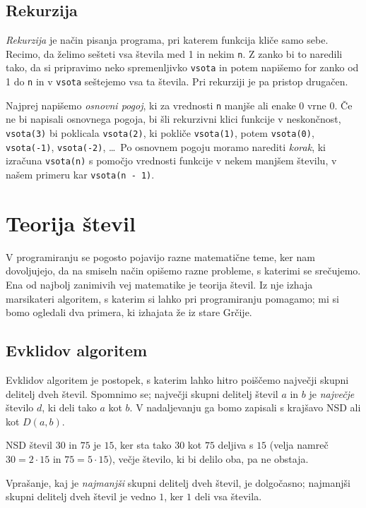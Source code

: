 \documentclass{book}
\begin{document}
\section{Rekurzija}

\emph{Rekurzija} je način pisanja programa, pri katerem funkcija kliče samo
sebe.
Recimo, da želimo sešteti vsa števila med 1 in nekim \verb+n+. Z zanko bi to
naredili tako, da si pripravimo neko spremenljivko \verb+vsota+ in potem
napišemo for zanko od 1 do \verb+n+ in v \verb+vsota+ seštejemo vsa ta števila. Pri
rekurziji je pa pristop drugačen.

\begin{examples}
\end{examples}

Najprej napišemo \emph{osnovni pogoj}, ki za vrednosti \verb+n+ manjše ali enake
0 vrne 0.
Če ne bi napisali osnovnega pogoja, bi šli rekurzivni klici funkcije v
neskončnost,
\verb+vsota(3)+ bi poklicala \verb+vsota(2)+, ki pokliče \verb+vsota(1)+, potem
\verb+vsota(0)+, \verb+vsota(-1)+, \verb+vsota(-2)+, \ldots \ Po osnovnem
pogoju moramo narediti \emph{korak}, ki izračuna \verb+vsota(n)+ s pomočjo
vrednosti funkcije v nekem manjšem številu, v našem primeru kar
\verb+vsota(n - 1)+.

\chapter{Teorija števil}


V programiranju se pogosto pojavijo razne matematične teme, ker nam dovoljujejo,
da na smiseln način opišemo razne probleme, s katerimi se srečujemo.
Ena od najbolj zanimivih vej matematike je teorija števil.
Iz nje izhaja marsikateri algoritem, s katerim si lahko pri programiranju
pomagamo; mi si bomo ogledali dva primera, ki izhajata že iz stare Grčije.

\section{Evklidov algoritem}

Evklidov algoritem je postopek, s katerim lahko hitro poiščemo največji skupni
delitelj dveh števil.
Spomnimo se; največji skupni delitelj števil $a$ in $b$ je \emph{največje}
število $d$, ki deli tako $a$ kot $b$.
V nadaljevanju ga bomo zapisali s krajšavo NSD ali kot $D(a, b)$.
\begin{examples}
  NSD števil $30$ in $75$ je $15$, ker sta tako $30$ kot
  $75$ deljiva s $15$ (velja namreč $30 = 2 \cdot 15$ in $75 = 5 \cdot 15$),
  večje število, ki bi delilo oba, pa ne obstaja.
\end{examples}
\begin{examples}
  Vprašanje, kaj je \emph{najmanjši} skupni delitelj dveh števil, je dolgočasno;
  najmanjši skupni delitelj dveh števil je vedno $1$, ker $1$ deli vsa števila.
\end{examples}
\end{document}
